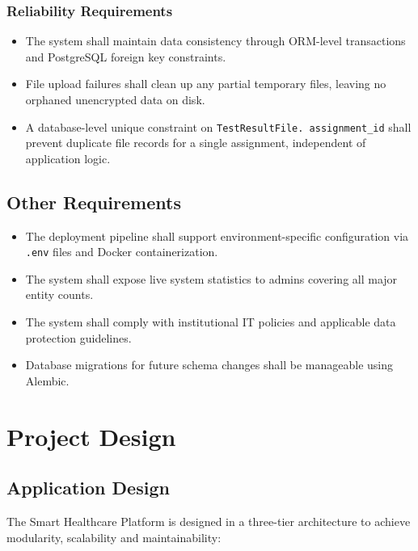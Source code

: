 \documentclass[a4paper,12pt]{report}
\begin{document}
\subsection{Reliability Requirements}
\begin{itemize}
    \item The system shall maintain data consistency through ORM-level transactions and PostgreSQL foreign key constraints.
    \item File upload failures shall clean up any partial temporary files, leaving no orphaned unencrypted data on disk.
    \item A database-level unique constraint on \texttt{TestResultFile. assignment\_id} shall prevent duplicate file records for a single assignment, independent of application logic.
\end{itemize}

\section{Other Requirements}
\begin{itemize}
    \item The deployment pipeline shall support environment-specific configuration via \texttt{.env} files and Docker containerization.
    \item The system shall expose live system statistics to admins covering all major entity counts.
    \item The system shall comply with institutional IT policies and applicable data protection guidelines.
    \item Database migrations for future schema changes shall be manageable using Alembic.
\end{itemize}


\chapter{Project Design}

\section{Application Design}

The Smart Healthcare Platform is designed in a three-tier architecture to achieve modularity, scalability and maintainability:
\end{document}
